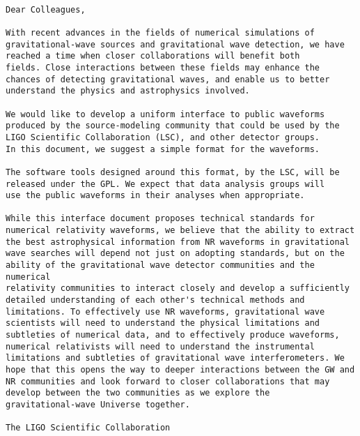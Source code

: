\documentclass[prd,preprintnumbers,superscriptaddress,eqsecnum]{revtex4}
\numberwithin{equation}{section}
\begin{document}
\begin{verbatim}

Dear Colleagues,

With recent advances in the fields of numerical simulations of
gravitational-wave sources and gravitational wave detection, we have
reached a time when closer collaborations will benefit both
fields. Close interactions between these fields may enhance the
chances of detecting gravitational waves, and enable us to better
understand the physics and astrophysics involved.

We would like to develop a uniform interface to public waveforms
produced by the source-modeling community that could be used by the
LIGO Scientific Collaboration (LSC), and other detector groups.
In this document, we suggest a simple format for the waveforms.

The software tools designed around this format, by the LSC, will be
released under the GPL. We expect that data analysis groups will
use the public waveforms in their analyses when appropriate.

While this interface document proposes technical standards for
numerical relativity waveforms, we believe that the ability to extract
the best astrophysical information from NR waveforms in gravitational
wave searches will depend not just on adopting standards, but on the
ability of the gravitational wave detector communities and the numerical
relativity communities to interact closely and develop a sufficiently
detailed understanding of each other's technical methods and
limitations. To effectively use NR waveforms, gravitational wave
scientists will need to understand the physical limitations and
subtleties of numerical data, and to effectively produce waveforms,
numerical relativists will need to understand the instrumental
limitations and subtleties of gravitational wave interferometers. We
hope that this opens the way to deeper interactions between the GW and
NR communities and look forward to closer collaborations that may
develop between the two communities as we explore the
gravitational-wave Universe together. 

The LIGO Scientific Collaboration

\end{verbatim}


\newpage


\maketitle
\end{document}
